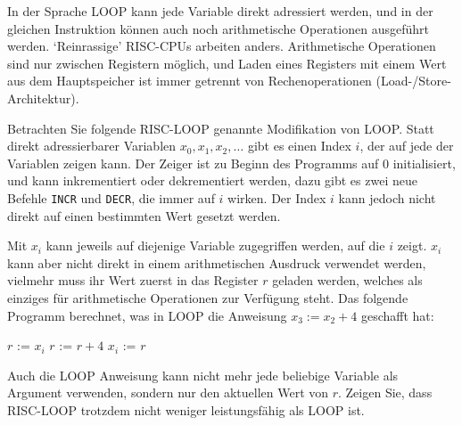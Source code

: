 In der Sprache LOOP kann jede Variable direkt adressiert werden, und
in der gleichen Instruktion können auch noch arithmetische Operationen
ausgeführt werden. `Reinrassige' RISC-CPUs arbeiten anders.
Arithmetische Operationen sind nur zwischen Registern möglich,
und Laden eines Registers mit einem Wert aus dem Hauptspeicher ist
immer getrennt von Rechenoperationen (Load-/Store-Architektur).

Betrachten Sie folgende RISC-LOOP genannte Modifikation von LOOP.
Statt direkt adressierbarer Variablen
$x_0,x_1,x_2,\dots$ gibt es einen Index $i$, der auf jede der Variablen zeigen
kann. Der Zeiger ist zu Beginn des Programms auf $0$ initialisiert, und kann
inkrementiert oder dekrementiert werden, dazu gibt
es zwei neue Befehle {\tt INCR} und {\tt DECR}, die immer auf $i$
wirken.
Der Index $i$ kann jedoch nicht direkt auf einen bestimmten Wert gesetzt werden.

Mit $x_i$
kann jeweils auf diejenige Variable zugegriffen werden, auf die $i$ zeigt.
$x_i$ kann aber nicht direkt in einem arithmetischen Ausdruck verwendet werden,
vielmehr muss ihr Wert zuerst in das Register $r$ geladen werden, welches
als einziges für arithmetische Operationen zur Verfügung steht. Das folgende
Programm berechnet, was in LOOP die Anweisung $x_3 := x_2 + 4$
geschafft hat:
\begin{algorithmic}[1]
\STATE $r$ := $x_i$
\STATE $r$ := $r + 4$
\STATE $x_i$ := $r$
\end{algorithmic}
Auch die LOOP Anweisung kann nicht mehr jede beliebige Variable als
Argument verwenden, sondern nur den aktuellen Wert von $r$.
Zeigen Sie, dass RISC-LOOP trotzdem nicht weniger leistungsfähig als
LOOP ist.

